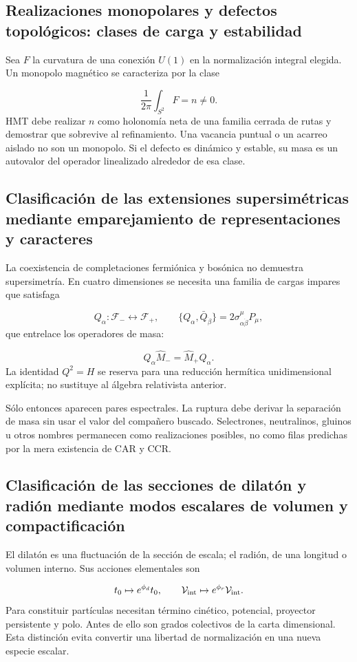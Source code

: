 \subsection{Realizaciones monopolares y defectos topológicos: clases de carga y estabilidad}
Sea \(F\) la curvatura de una conexión \(U(1)\) en la normalización integral elegida. Un monopolo magnético se caracteriza por la clase

\[
\frac1{2\pi}\int_{S^2}F=n\ne0.
\]
HMT debe realizar \(n\) como holonomía neta de una familia cerrada de rutas y demostrar que sobrevive al refinamiento. Una vacancia puntual o un acarreo aislado no son un monopolo. Si el defecto es dinámico y estable, su masa es un autovalor del operador linealizado alrededor de esa clase.

\subsection{Clasificación de las extensiones supersimétricas mediante emparejamiento de representaciones y caracteres}
La coexistencia de completaciones fermiónica y bosónica no demuestra supersimetría. En cuatro dimensiones se necesita una familia de cargas impares que satisfaga

\[
Q_\alpha:\mathcal F_-\longleftrightarrow\mathcal F_+,
\qquad
\{Q_\alpha,\bar Q_{\dot\beta}\}
=2\sigma^\mu_{\alpha\dot\beta}P_\mu,
\]
que entrelace los operadores de masa:

\[
Q_\alpha\widehat M_-=\widehat M_+Q_\alpha.
\]
La identidad \(Q^2=H\) se reserva para una reducción hermítica unidimensional explícita; no sustituye al álgebra relativista anterior.

Sólo entonces aparecen pares espectrales. La ruptura debe derivar la separación de masa sin usar el valor del compañero buscado. Selectrones, neutralinos, gluinos u otros nombres permanecen como realizaciones posibles, no como filas predichas por la mera existencia de CAR y CCR.

\subsection{Clasificación de las secciones de dilatón y radión mediante modos escalares de volumen y compactificación}
El dilatón es una fluctuación de la sección de escala; el radión, de una longitud o volumen interno. Sus acciones elementales son

\[
t_0\mapsto e^{\phi_d}t_0,
\qquad
\mathcal V_{\rm int}\mapsto e^{\phi_r}\mathcal V_{\rm int}.
\]
Para constituir partículas necesitan término cinético, potencial, proyector persistente y polo. Antes de ello son grados colectivos de la carta dimensional. Esta distinción evita convertir una libertad de normalización en una nueva especie escalar.

